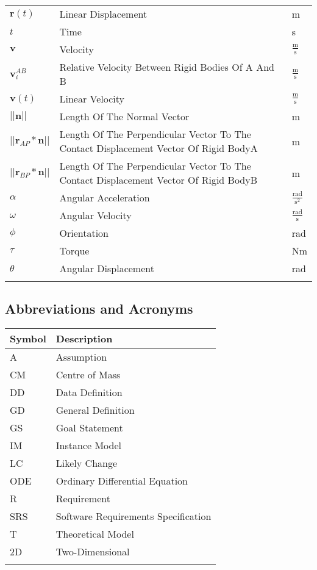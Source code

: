 \documentclass[12pt]{article}
\begin{document}
\begin{longtable*}{l l l}
\\
$\mathbf{r}(t)$ & Linear Displacement & m
\\
$t$ & Time & s
\\
$\mathbf{v}$ & Velocity & $\frac{\text{m}}{\text{s}}$
\\
$\mathbf{v}_{i}^{AB}$ & Relative Velocity Between Rigid Bodies Of A And B & $\frac{\text{m}}{\text{s}}$
\\
$\mathbf{v}(t)$ & Linear Velocity & $\frac{\text{m}}{\text{s}}$
\\
$||\mathbf{n}||$ & Length Of The Normal Vector & m
\\
$||\mathbf{r}_{AP}*\mathbf{n}||$ & Length Of The Perpendicular Vector To The Contact Displacement Vector Of Rigid BodyA & m
\\
$||\mathbf{r}_{BP}*\mathbf{n}||$ & Length Of The Perpendicular Vector To The Contact Displacement Vector Of Rigid BodyB & m
\\
$\alpha{}$ & Angular Acceleration & $\frac{\text{rad}}{\text{s}^{2}}$
\\
$\omega{}$ & Angular Velocity & $\frac{\text{rad}}{\text{s}}$
\\
$\phi{}$ & Orientation & rad
\\
$\tau{}$ & Torque & Nm
\\
$\theta{}$ & Angular Displacement & rad
\\
\bottomrule
\label{Table:TablofSymb}
\end{longtable*}
\subsection{Abbreviations and Acronyms}
\label{Sec:AbbrandAcro}
\begin{longtable*}{l l}
\toprule
Symbol & Description
\\
\midrule
A & Assumption
\\
CM & Centre of Mass
\\
DD & Data Definition
\\
GD & General Definition
\\
GS & Goal Statement
\\
IM & Instance Model
\\
LC & Likely Change
\\
ODE & Ordinary Differential Equation
\\
R & Requirement
\\
SRS & Software Requirements Specification
\\
T & Theoretical Model
\\
2D & Two-Dimensional
\\
\bottomrule
\label{Table:AbbrandAcro}
\end{longtable*}
\end{document}
